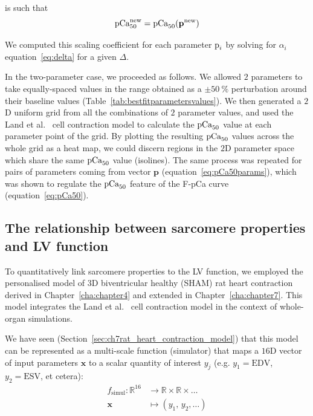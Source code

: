 \noindent
is such that
%
\begin{equation}
    \textrm{pCa}_{50}^{\text{new}} = \textrm{pCa}_{50}(\mathbf{p}^{\text{new}})
\end{equation}

\vspace{0.2cm}\noindent
We computed this scaling coefficient for each parameter $\textrm{p}_i$ by solving for $\alpha_i$ equation~\eqref{eq:delta} for a given $\Delta$.

\vspace{0.2cm}
In the two-parameter case, we proceeded as follows. We allowed $2$ parameters to take equally-spaced values in the range obtained as a $\pm\SI{50}{\percent}$ perturbation around their baseline values (Table~\ref{tab:bestfitparametersvalues}). We then generated a $2$D uniform grid from all the combinations of $2$ parameter values, and used the Land et al.~\cite{Land:2012} cell contraction model to calculate the $\textrm{pCa}_{50}$ value at each parameter point of the grid. By plotting the resulting $\textrm{pCa}_{50}$ values across the whole grid as a heat map, we could discern regions in the $2$D parameter space which share the same $\textrm{pCa}_{50}$ value (isolines). The same process was repeated for pairs of parameters coming from vector $\mathbf{p}$ (equation~\eqref{eq:pCa50params}), which was shown to regulate the $\textrm{pCa}_{50}$ feature of the F-pCa curve (equation~\eqref{eq:pCa50}).


%
%
%
\subsection{The relationship between sarcomere properties and LV function}\label{subsec:quantlink}
To quantitatively link sarcomere properties to the LV function, we employed the personalised model of $3$D biventricular healthy (SHAM) rat heart contraction derived in Chapter~\ref{cha:chapter4} and extended in Chapter~\ref{cha:chapter7}. This model integrates the Land et al.~\cite{Land:2012} cell contraction model in the context of whole-organ simulations.

\vspace{0.2cm}
We have seen (Section~\ref{sec:ch7rat_heart_contraction_model}) that this model can be represented as a multi-scale function (simulator) that maps a $16$D vector of input parameters $\mathbf{x}$ to a scalar quantity of interest $y_j$ (e.g. $y_1=\textrm{EDV}$, $y_2=\textrm{ESV}$, et cetera):
%
\begin{align}\label{eq:fsimul}
    f_{\textrm{simul}}\colon\mathbb{R}^{16} &\to\mathbb{R}\times\mathbb{R}\times\dots \\
    \mathbf{x} &\mapsto (y_1,\,y_2,\dots) \nonumber
\end{align}

